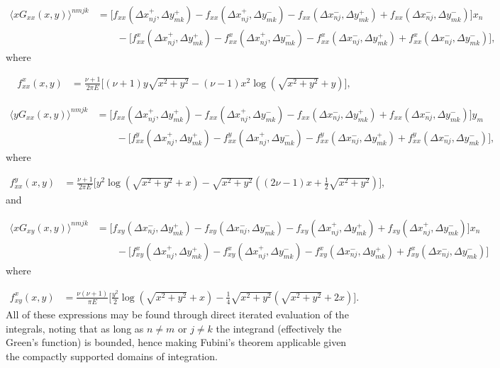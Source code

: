 \documentclass[aps,prl,reprint,twocolumn,groupedaddress,showpacs]{revtex4-1}
\begin{document}
\begin{widetext}
\begin{align}
\langle xG_{xx}(x,y) \rangle^{nmjk} & =\Big[f_{xx}(\Delta x_{nj}^+,\Delta y_{mk}^+)
- f_{xx}(\Delta x_{nj}^+,\Delta y_{mk}^-)
-f_{xx}(\Delta x_{nj}^-, \Delta y_{mk}^+)+ f_{xx}
(\Delta x_{nj}^- , \Delta y_{mk}^-)\Big] x_n\nonumber\\
\: &\qquad - \Big[ f^x_{xx}( \Delta x_{nj}^+ , \Delta y_{mk}^+)- 
f^x_{xx}(\Delta x_{nj}^+ , \Delta y_{mk}^-)-
f^x_{xx}(\Delta x_{nj}^-, \Delta y_{mk}^+) + f^x_{xx}(\Delta x_{nj}^- , \Delta y_{mk}^-)\Big],
\end{align}
%
where

\begin{align}
f^x_{xx}(x,y) &= \frac{\nu+1}{2\pi E} \Big[ (\nu+1)y\sqrt{x^2 + y^2}
- (\nu-1) x^2\log\left(\sqrt{x^2 + y^2} +y  \right)  \Big],\label{eq:fxxx}
\end{align}

\begin{align}
\langle yG_{xx}(x,y) \rangle^{nmjk} & = 
\Big[f_{xx}(\Delta x_{nj}^{+},\Delta y_{mk}^+)-f_{xx}(\Delta x_{nj}^+,\Delta y_{mk}^-)
-f_{xx}(\Delta x_{nj}^{-}, \Delta y_{mk}^+) + 
f_{xx}(\Delta x_{nj}^{-}, \Delta y_{mk}^-)\Big] y_m\nonumber\\
\: &\qquad - \Big[ f^y_{xx}(\Delta x_{nj}^+,\Delta y_{mk}^+) 
- f^y_{xx}(\Delta x_{nj}^+,\Delta y_{mk}^-)
- f^y_{xx}(\Delta x_{nj}^-,\Delta y_{mk}^+) 
+ f^y_{xx}(\Delta x_{nj}^-,\Delta y_{mk}^-)\Big],
\end{align}
%
where

\begin{align}
f^y_{xx}(x,y) &=\frac{\nu+1}{2\pi E} \Bigg[y^2\log\left(\sqrt{x^2+y^2}+x \right)
-\sqrt{x^2+y^2}\left((2\nu-1)x + \frac{1}{2}\sqrt{x^2+y^2} \right)  \Bigg], \label{eq:fyxx}
\end{align}
%
and

\begin{align}
\langle xG_{xy}(x,y)\rangle^{nmjk} & = 
\Big[f_{xy}(\Delta x_{nj}^{-},\Delta y_{mk}^+)-f_{xy}(\Delta x_{nj}^{-},\Delta y_{mk}^-)
- f_{xy}(\Delta x_{nj}^{+},\Delta y_{mk}^+) + f_{xy}(\Delta x_{nj}^+,\Delta y_{mk}^-) \Big]x_n \nonumber\\
\: & \qquad -\Big[f_{xy}^x(\Delta x_{nj}^{+},\Delta y_{mk}^+) - f_{xy}^x(\Delta x_{nj}^{+},\Delta y_{mk}^-)
-f_{xy}^x(\Delta x_{nj}^{-},\Delta y_{mk}^+)+f_{xy}^x(\Delta x_{nj}^{-},\Delta y_{mk}^-)\Big]
\end{align}
%
where

\begin{align}
f_{xy}^x(x,y) &=\frac{\nu(\nu+1)}{\pi E}\Big[ \frac{y^2}{2}\log\left(\sqrt{x^2+y^2} +x\right)
-\frac{1}{4}\sqrt{x^2+y^2}\left(\sqrt{x^2+y^2}+2x\right) \Big]. \label{eq:fxxy}
\end{align}
All of these expressions may be found through direct iterated
evaluation of the integrals, noting that as long as $n\neq m$ or
$j\neq k$ the integrand (effectively the Green's function) is bounded,
hence making Fubini's theorem applicable given the compactly supported
domains of integration.


\end{widetext}
\end{document}

